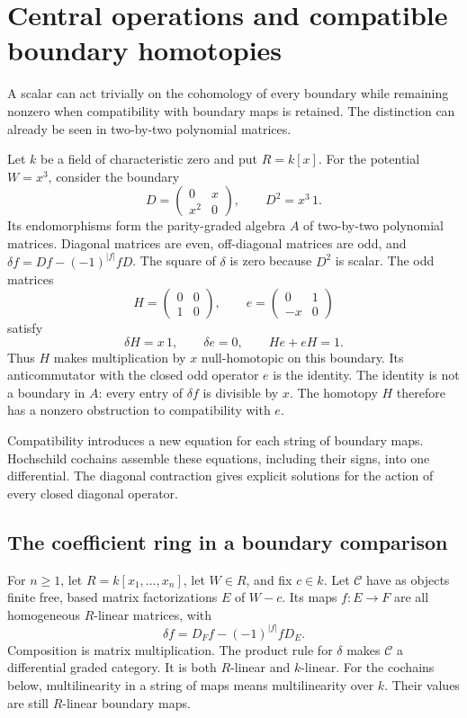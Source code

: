 \chapter{Central operations and compatible boundary homotopies}
\label{ch:cc-boundary}

A scalar can act trivially on the cohomology of every boundary
while remaining nonzero when compatibility with boundary maps
is retained. The distinction can already be seen in two-by-two
polynomial matrices.

Let \(k\) be a field of characteristic zero and put \(R=k[x]\).
For the potential \(W=x^3\), consider the boundary
\[
 D=\begin{pmatrix}0&x\\x^2&0\end{pmatrix},\qquad D^2=x^3\,1.
\]
Its endomorphisms form the parity-graded algebra \(A\) of
two-by-two polynomial matrices. Diagonal matrices are even,
off-diagonal matrices are odd, and
\(\delta f=Df-(-1)^{|f|}fD\).
The square of \(\delta\) is zero because \(D^2\) is scalar.
The odd matrices
\[
 H=\begin{pmatrix}0&0\\1&0\end{pmatrix},\qquad
 e=\begin{pmatrix}0&1\\-x&0\end{pmatrix}
\]
satisfy
\begin{equation}
 \delta H=x\,1,\qquad \delta e=0,\qquad He+eH=1.
 \label{eq:cc-cubic-opening}
\end{equation}
Thus \(H\) makes multiplication by \(x\) null-homotopic on this
boundary. Its anticommutator with the closed odd operator \(e\)
is the identity. The identity is not a boundary in \(A\):
every entry of \(\delta f\) is divisible by \(x\).
The homotopy \(H\) therefore has a nonzero obstruction to
compatibility with \(e\).

Compatibility introduces a new equation for each string of
boundary maps. Hochschild cochains assemble these equations,
including their signs, into one differential. The diagonal
contraction gives explicit solutions for the action of every
closed diagonal operator.

\section{The coefficient ring in a boundary comparison}
\label{sec:cc-coefficients}

For \(n\geq1\), let \(R=k[x_1,\ldots,x_n]\), let \(W\in R\),
and fix \(c\in k\). Let \(\mathcal C\) have as objects finite
free, based matrix factorizations \(E\) of \(W-c\).
Its maps \(f:E\to F\) are all homogeneous \(R\)-linear matrices,
with
\[
 \delta f=D_Ff-(-1)^{|f|}fD_E.
\]
Composition is matrix multiplication. The product rule for
\(\delta\) makes \(\mathcal C\) a differential graded category.
It is both \(R\)-linear and \(k\)-linear. For the cochains below,
multilinearity in a string of maps means multilinearity over \(k\).
Their values are still \(R\)-linear boundary maps.

